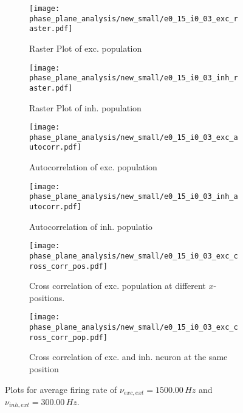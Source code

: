 \documentclass[a4paper,12pt]{article}
\begin{document}
\begin{figure}
    \begin{subfigure}[b]{0.49\textwidth}
        \texttt{[image: phase\_plane\_analysis/new\_small/e0\_15\_i0\_03\_exc\_raster.pdf]}
        \caption{Raster Plot of exc. population}
    \end{subfigure}
    \begin{subfigure}[b]{0.49\textwidth}
        \texttt{[image: phase\_plane\_analysis/new\_small/e0\_15\_i0\_03\_inh\_raster.pdf]}
        \caption{Raster Plot of inh. population}
    \end{subfigure}
    \begin{subfigure}[b]{0.49\textwidth}
        \texttt{[image: phase\_plane\_analysis/new\_small/e0\_15\_i0\_03\_exc\_autocorr.pdf]}
        \caption{Autocorrelation of exc. population}
    \end{subfigure}
    \begin{subfigure}[b]{0.49\textwidth}
        \texttt{[image: phase\_plane\_analysis/new\_small/e0\_15\_i0\_03\_inh\_autocorr.pdf]}
        \caption{Autocorrelation of inh. populatio}
    \end{subfigure}
    \begin{subfigure}[b]{0.49\textwidth}
        \texttt{[image: phase\_plane\_analysis/new\_small/e0\_15\_i0\_03\_exc\_cross\_corr\_pos.pdf]}
        \caption{Cross correlation of exc. population at different $x$-positions.}
    \end{subfigure}
    \begin{subfigure}[b]{0.49\textwidth}
        \texttt{[image: phase\_plane\_analysis/new\_small/e0\_15\_i0\_03\_exc\_cross\_corr\_pop.pdf]}
        \caption{Cross correlation of exc. and inh. neuron at the same position}
    \end{subfigure}
    \caption{Plots for average firing rate of 
                $\nu_{exc,ext} = 1500.00 \,\si{Hz}$ and $\nu_{inh,ext} = 300.00 \,\si{Hz}$.
                }
\end{figure}
    
\end{document}
